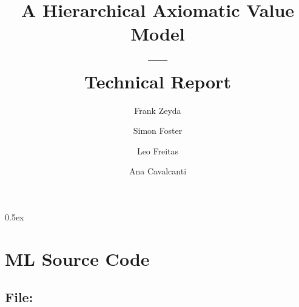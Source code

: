 \documentclass[11pt,a4paper]{article}
\begin{document}

\title{A Hierarchical Axiomatic Value Model\\---\\Technical Report}

\author{Frank Zeyda \and Simon Foster \and Leo Freitas \and Ana Cavalcanti}

\maketitle

\tableofcontents

\newpage

\parindent 0pt\parskip 0.5ex


%

%


\newpage


\newpage


\newpage


\newpage


\newpage


\newpage


\newpage


\newpage


\section{ML Source Code}


\subsection{File: }


\newpage

\end{document}
